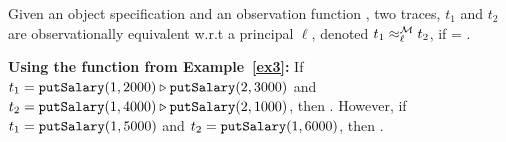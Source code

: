 \documentclass[acmsmall,screen,review, nonacm]{acmart}
\begin{document}
\begin{definition}\label{def:obsim}
Given an object specification \classpart and an observation function \obsymbol,  two traces, $t_1$ and $t_2$ are observationally equivalent w.r.t a principal $\ell$, denoted $t_1 \approx^{\mathcal{M}}_{\ell} t_2$, if  =  .
\end{definition}


\textbf{Using the \obsymbol function from Example~\ref{ex3}: }
If $t_1 = \texttt{putSalary}(1, 2000) \triangleright \texttt{putSalary}(2, 3000)$ and  $t_2 = \texttt{putSalary}(1, 4000) \triangleright \texttt{putSalary}(2, 1000)$, then .
However, if $t_1 = \texttt{putSalary}(1, 5000)$ and  $t_2 = \texttt{putSalary}(1, 6000)$, then   .





\end{document}
